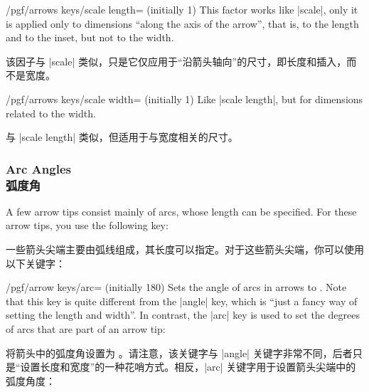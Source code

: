 \begin{key}{/pgf/arrows keys/scale length= (initially 1)}
    This factor works like |scale|, only it is applied only to dimensions
    ``along the axis of the arrow'', that is, to the length and to the inset,
    but not to the width.
    
    该因子与 |scale| 类似，只是它仅应用于“沿箭头轴向”的尺寸，即长度和插入，而不是宽度。
\begin{codeexample}[preamble={\usetikzlibrary{arrows.meta}}]
\end{codeexample}
\end{key}

\begin{key}{/pgf/arrows keys/scale width= (initially 1)}
    Like |scale length|, but for dimensions related to the width.
    
    与 |scale length| 类似，但适用于与宽度相关的尺寸。
\begin{codeexample}[preamble={\usetikzlibrary{arrows.meta}}]
\end{codeexample}
\end{key}


\subsubsection{Arc Angles\\弧度角}

A few arrow tips consist mainly of arcs, whose length can be specified. For
these arrow tips, you use the following key:

一些箭头尖端主要由弧线组成，其长度可以指定。对于这些箭头尖端，你可以使用以下关键字：

\begin{key}{/pgf/arrow keys/arc= (initially 180)}
    Sets the angle of arcs in arrows to . Note that this key is
    quite different from the |angle| key, which is ``just a fancy way of
    setting the length and width''. In contrast, the |arc| key is used to set
    the degrees of arcs that are part of an arrow tip:
    
    将箭头中的弧度角设置为 。请注意，该关键字与 |angle| 关键字非常不同，后者只是“设置长度和宽度”的一种花哨方式。相反，|arc| 关键字用于设置箭头尖端中的弧度角度：
\begin{codeexample}[preamble={\usetikzlibrary{arrows.meta}}]
\end{codeexample}
\end{key}


